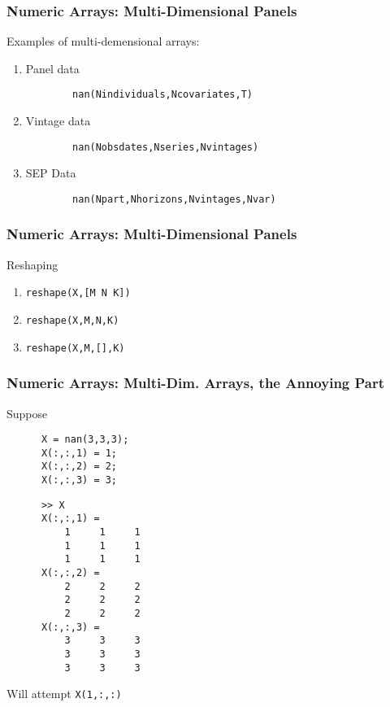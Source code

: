 \documentclass{beamer}
\begin{document}
  \begin{frame}[fragile]
    \frametitle{Numeric Arrays: Multi-Dimensional Panels}

    Examples of multi-demensional arrays:
    \begin{enumerate}
      \item Panel data
        \begin{lstlisting}
        nan(Nindividuals,Ncovariates,T)
        \end{lstlisting}
      \item Vintage data
        \begin{lstlisting}
        nan(Nobsdates,Nseries,Nvintages)
        \end{lstlisting}
      \item SEP Data
        \begin{lstlisting}
        nan(Npart,Nhorizons,Nvintages,Nvar)
        \end{lstlisting}
    \end{enumerate}
	\end{frame}


  \begin{frame}[fragile]
    \frametitle{Numeric Arrays: Multi-Dimensional Panels}

    Reshaping
    \begin{enumerate}
      \item \texttt{reshape(X,[M N K])}
      \item \texttt{reshape(X,M,N,K)}
      \item \texttt{reshape(X,M,[],K)}
    \end{enumerate}
	\end{frame}


  \begin{frame}[fragile]
    \frametitle{Numeric Arrays: Multi-Dim. Arrays, the Annoying Part}

    Suppose
    \begin{lstlisting}
      X = nan(3,3,3);
      X(:,:,1) = 1;
      X(:,:,2) = 2;
      X(:,:,3) = 3;
    \end{lstlisting}\pause
    \begin{lstlisting}
      >> X
      X(:,:,1) =
          1     1     1
          1     1     1
          1     1     1
      X(:,:,2) =
          2     2     2
          2     2     2
          2     2     2
      X(:,:,3) =
          3     3     3
          3     3     3
          3     3     3
    \end{lstlisting}\pause
    Will attempt \texttt{X(1,:,:)}
	\end{frame}
\end{document}

